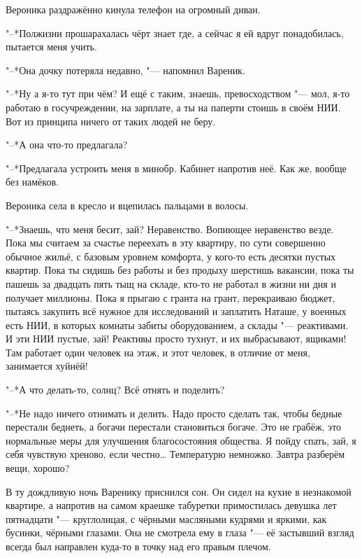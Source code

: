 Вероника раздражённо кинула телефон на огромный диван.

"--*Полжизни прошарахалась чёрт знает где, а сейчас я ей вдруг понадобилась, пытается меня учить.

"--*Она дочку потеряла недавно, "--- напомнил Вареник.

"--*Ну а я-то тут при чём?
И ещё с таким, знаешь, превосходством "--- мол, я-то работаю в госучреждении, на зарплате, а ты на паперти стоишь в своём НИИ.
Вот из принципа ничего от таких людей не беру.

"--*А она что-то предлагала?

"--*Предлагала устроить меня в минобр.
Кабинет напротив неё.
Как же, вообще без намёков.

Вероника села в кресло и вцепилась пальцами в волосы.

"--*Знаешь, что меня бесит, зай?
Неравенство.
Вопиющее неравенство везде.
Пока мы считаем за счастье переехать в эту квартиру, по сути совершенно обычное жильё, с базовым уровнем комфорта, у кого-то есть десятки пустых квартир.
Пока ты сидишь без работы и без продыху шерстишь вакансии, пока ты пашешь за двадцать пять тыщ на складе, кто-то не работал в жизни ни дня и получает миллионы.
Пока я прыгаю с гранта на грант, перекраиваю бюджет, пытаясь закупить всё нужное для исследований и заплатить Наташе, у военных есть НИИ, в которых комнаты забиты оборудованием, а склады "--- реактивами.
И эти НИИ пустые, зай!
Реактивы просто тухнут, и их выбрасывают, ящиками!
Там работает один человек на этаж, и этот человек, в отличие от меня, занимается хуйнёй!

"--*А что делать-то, солнц?
Всё отнять и поделить?

"--*Не надо ничего отнимать и делить.
Надо просто сделать так, чтобы бедные перестали беднеть, а богачи перестали становиться богаче.
Это не грабёж, это нормальные меры для улучшения благосостояния общества.
Я пойду спать, зай, я себя чувствую хреново, если честно\ldots{}
Температурю немножко.
Завтра разберём вещи, хорошо?

\asterism

\label{Sat_2012_06_09}

В ту дождливую ночь Варенику приснился сон.
Он сидел на кухне в незнакомой квартире, а напротив на самом краешке табуретки примостилась девушка лет пятнадцати "--- круглолицая, с чёрными масляными кудрями и яркими, как бусинки, чёрными глазами.
Она не смотрела ему в глаза "--- её застывший взгляд всегда был направлен куда-то в точку над его правым плечом.

